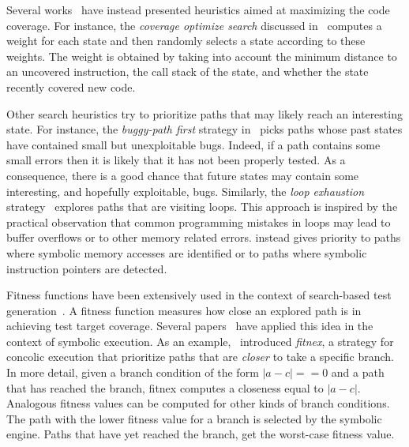 Several works~\cite{EXE-CCS06,KLEE-OSDI08,MAYHEM-SP12,CKC-TOCS12} have instead presented heuristics aimed at maximizing the code coverage. For instance, the {\em coverage optimize search} discussed in~\cite{KLEE-OSDI08} computes a weight for each state and then randomly selects a state according to these weights. The weight is obtained by taking into account the minimum distance to an uncovered instruction, the call stack of the state, and whether the state recently covered new code.

Other search heuristics try to prioritize paths that may likely reach an interesting state. For instance, the {\em buggy-path first} strategy in~\cite{AEG-NDSS11} picks paths whose past states have contained small but unexploitable bugs. Indeed, if a path contains some small errors then it is likely that it has not been properly tested. As a consequence, there is a good chance that future states may contain some interesting, and hopefully exploitable, bugs. Similarly, the {\em loop exhaustion} strategy~\cite{AEG-NDSS11} explores paths that are visiting loops. This approach is inspired by the practical observation that common programming mistakes in loops may lead to buffer overflows or to other memory related errors. \cite{MAYHEM-SP12} instead gives priority to paths where symbolic memory accesses are identified or to paths where symbolic instruction pointers are detected. 

Fitness functions have been extensively used in the context of search-based test generation~\cite{M-STVR04}. A fitness function measures how close an explored path is in achieving test target coverage. Several papers~\cite{XTD-DSN09,CS-CACM13,XTD-DSN09} have applied this idea in the context of symbolic execution. As an example,~\cite{XTD-DSN09} introduced {\em fitnex}, a strategy for concolic execution that prioritize paths that are {\em closer} to take a specific branch. In more detail, given a branch condition of the form $|a - c| == 0$ and a path that has reached the branch, fitnex computes a closeness equal to $|a - c|$. Analogous fitness values can be computed for other kinds of branch conditions. The path with the lower fitness value for a branch is selected by the symbolic engine. Paths that have yet reached the branch, get the worst-case fitness value.

